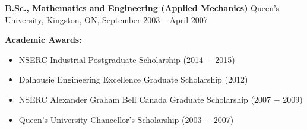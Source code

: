 \documentclass[10pt]{article}
\begin{document}
\begin{description}
\begin{description}
      \end{description}
      \item[]\textbf{B.Sc., Mathematics and Engineering (Applied Mechanics)}\newline%
      Queen's University, Kingston, ON, September 2003 -- April 2007
        \item[] \textbf{Academic Awards:}
          \begin{itemize}
            \item NSERC Industrial Postgraduate Scholarship (2014 $-$ 2015)
            \item Dalhousie Engineering Excellence Graduate Scholarship (2012)
            \item NSERC Alexander Graham Bell Canada Graduate Scholarship (2007 $-$ 2009)
            \item Queen's University Chancellor's Scholarship (2003 $-$ 2007)
          \end{itemize}
\end{description}
\end{document}
